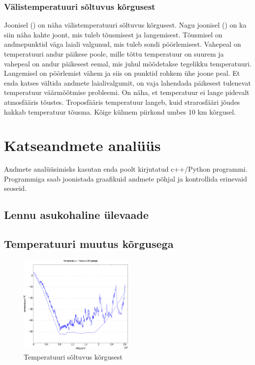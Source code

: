\documentclass{trkut}%
\begin{document}
\subsection{Välistemperatuuri sõltuvus kõrgusest}
Joonisel () on näha välistemperatuuri sõltuvus kõrgusest. Nagu  joonisel () on ka siin näha kahte joont, mis tuleb tõusmisest ja langemisest. Tõusmisel on andmepunktid väga laiali valgunud, mis tuleb sondi pöörlemisest. Vahepeal on temperatuuri andur päikese poole, mille tõttu temperatuur on suurem ja vahepeal on andur päikesest eemal, mis juhul mõõdetakse tegelikku temperatuuri. Langemisel on pöörlemist vähem ja siis on punktid rohkem ühe joone peal. Et enda katses vältida andmete laialivalgumit, on vaja lahendada päikesest tulenevat temperatuur väärmõõtmise probleemi.
\newline On näha, et temperatuur ei lange pidevalt atmosfääris tõustes. Troposfääris temperatuur langeb, kuid strarosfääri jõudes hakkab temperatuur tõusma. Kõige külmem piirkond umbes 10 km kõrgusel.



\chapter{Katseandmete analüüs}
Andmete analüüsimisks kasutan enda poolt kirjutatud c++/Python programmi. Programmiga saab joonistada graafikuid andmete põhjal ja kontrollida erinevaid seoseid.

\section{Lennu asukohaline ülevaade}

\section{Temperatuuri muutus kõrgusega}

\begin{figure}[h]
	\includegraphics[width=0.5\textwidth]{PicGra/tempkõr.pdf}
	\caption{Temperatuuri sõltuvus kõrgusest}
	\label{TempKõrgus}%
\end{figure}
\end{document}

